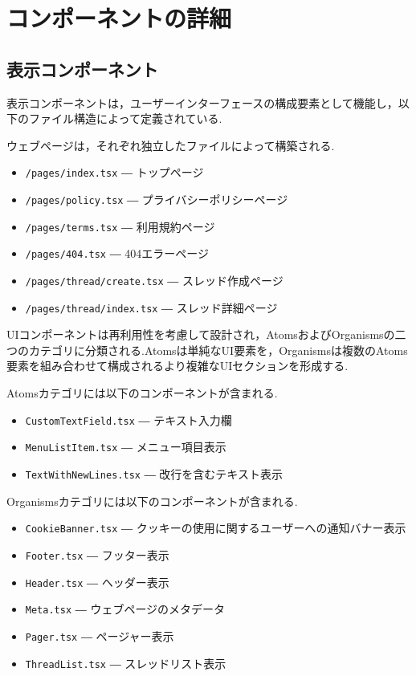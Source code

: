 \documentclass[b5paper,12pt,dvipdfmx]{jsreport}
\begin{document}
\section{コンポーネントの詳細}


\subsection*{表示コンポーネント}

表示コンポーネントは，ユーザーインターフェースの構成要素として機能し，以下のファイル構造によって定義されている.

ウェブページは，それぞれ独立したファイルによって構築される.

\begin{itemize}
\item \texttt{/pages/index.tsx} ― トップページ
\item \texttt{/pages/policy.tsx} ― プライバシーポリシーページ
\item \texttt{/pages/terms.tsx} ― 利用規約ページ
\item \texttt{/pages/404.tsx} ― 404エラーページ
\item \texttt{/pages/thread/create.tsx} ― スレッド作成ページ
\item \texttt{/pages/thread/index.tsx} ― スレッド詳細ページ
\end{itemize}

UIコンポーネントは再利用性を考慮して設計され，AtomsおよびOrganismsの二つのカテゴリに分類される.Atomsは単純なUI要素を，Organismsは複数のAtoms要素を組み合わせて構成されるより複雑なUIセクションを形成する.

Atomsカテゴリには以下のコンポーネントが含まれる.

\begin{itemize}
    \item \texttt{CustomTextField.tsx} ― テキスト入力欄
    \item \texttt{MenuListItem.tsx} ― メニュー項目表示
    \item \texttt{TextWithNewLines.tsx} ― 改行を含むテキスト表示
\end{itemize}

Organismsカテゴリには以下のコンポーネントが含まれる.

\begin{itemize}
    \item \texttt{CookieBanner.tsx} ― クッキーの使用に関するユーザーへの通知バナー表示
    \item \texttt{Footer.tsx} ― フッター表示
    \item \texttt{Header.tsx} ― ヘッダー表示
    \item \texttt{Meta.tsx} ― ウェブページのメタデータ
    \item \texttt{Pager.tsx} ― ページャー表示
    \item \texttt{ThreadList.tsx} ― スレッドリスト表示
\end{itemize}
\end{document}
